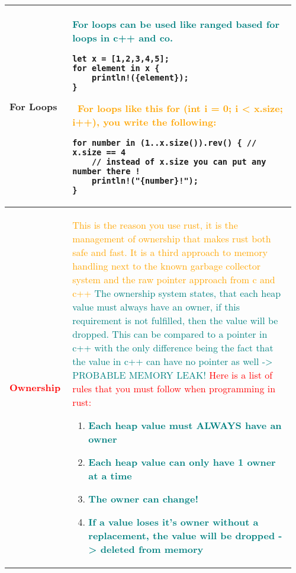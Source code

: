 \documentclass[main.tex,fontsize=8pt,paper=a4,paper=portrait,DIV=calc,]{scrartcl}
\begin{document}
\begin{table}[ht!]
\begin{tabular}{|m{0.2\linewidth}|m{0.755\linewidth}|}
\hline
For Loops &
\textcolor{teal}{For loops can be used like ranged based for loops in c++ and co.}\newline
\begin{lstlisting}
let x = [1,2,3,4,5];
for element in x {
    println!({element});
}
\end{lstlisting}
\, \newline
\textcolor{orange}{For loops like this for (int i = 0; i < x.size; i++), you write the following:}\newline
\begin{lstlisting}
for number in (1..x.size()).rev() { // x.size == 4
    // instead of x.size you can put any number there !
    println!("{number}!");
}
\end{lstlisting}\\
\hline
\textbf{\textcolor{red}{Ownership}} & 
\textcolor{orange}{This is the reason you use rust, it is the management of ownership that makes rust both safe and fast. It is a third approach to memory handling next to the known garbage collector system and the raw pointer approach from c and c++}\newline
\textcolor{teal}{The ownership system states, that each heap value must always have an owner, if this requirement is not fulfilled, then the value will be dropped.\newline
This can be compared to a pointer in c++ with the only difference being the fact that the value in c++ can have no pointer as well -> PROBABLE MEMORY LEAK!}\newline
\textcolor{red}{Here is a list of rules that you must follow when programming in rust:} \newline
\begin{enumerate}
\item \textcolor{teal}{\textbf{Each heap value must ALWAYS have an owner}}
\item \textcolor{teal}{\textbf{Each heap value can only have 1 owner at a time}}
\item \textcolor{teal}{\textbf{The owner can change!}}
\item \textcolor{teal}{\textbf{If a value loses it's owner without a replacement, the value will be dropped -> deleted from memory}}
\vspace{-3mm}
\end{enumerate}
\\
\hline

\end{tabular}
\end{table}
\end{document}

